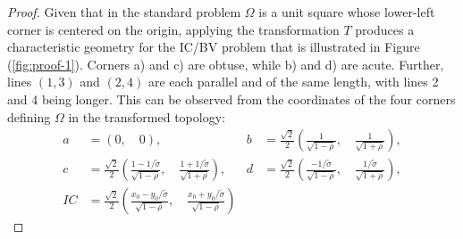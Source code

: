 \begin{proof}
  Given that in the standard problem $\Omega$ is a unit square
  whose lower-left corner is centered on the origin, applying the
  transformation $T$ produces a characteristic geometry for the IC/BV
  problem that is illustrated in Figure (\ref{fig:proof-1}). Corners
  a) and c) are obtuse, while b) and d) are acute. Further, lines
  $(1,3)$ and $(2, 4)$ are each parallel and of the same length, with
  lines 2 and 4 being longer. This can be observed from the
  coordinates of the four corners defining $\Omega$ in the transformed
  topology:
  \begin{align*}
    a &= (0,\quad 0),&
                       b &= \frac{\sqrt{2}}{2} \left( \frac{1}{\sqrt{1-\rho}},\quad \frac{1}{\sqrt{1+\rho}} \right), \\
    c &= \frac{\sqrt{2}}{2} \left( \frac{1-1/\tilde{\sigma}}{\sqrt{1-\rho}},\quad \frac{1+1/\tilde{\sigma}}{\sqrt{1+\rho}} \right),&
                                                                                                                                     d &= \frac{\sqrt{2}}{2} \left( \frac{-1/\tilde{\sigma}}{\sqrt{1-\rho}},\quad \frac{1/\tilde{\sigma}}{\sqrt{1+\rho}} \right), \\
    IC &= \frac{\sqrt{2}}{2} \left( \frac{x_0 - y_0/\tilde{\sigma}}{\sqrt{1-\rho}},\quad \frac{x_0 + y_0/\tilde{\sigma}}{\sqrt{1-\rho}} \right)
  \end{align*}


\end{proof}
